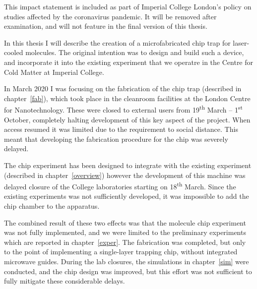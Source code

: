 This impact statement is included as part of Imperial College London's policy
on studies affected by the coronavirus pandemic. It will be removed after
examination, and will not feature in the final version of this thesis.

In this thesis I will describe the creation of a microfabricated chip trap for
laser-cooled \CaF{} molecules. The original intention was to design and build
such a device, and incorporate it into the existing \CaF{} experiment that we
operatre in the Centre for Cold Matter at Imperial College.

In March 2020 I was focusing on the fabrication of the
chip trap (described in chapter~\ref{fab}), which took place in the cleanroom
facilities at the London Centre for Nanotechnology. These were closed to
external users from 19\textsuperscript{th} March -- 1\textsuperscript{st}
October, completely halting development of this key aspect of the project. When
access resumed it was limited due to the requirement to social distance. This
meant that developing the fabrication procedure for the chip was severely
delayed.

The chip experiment has been designed to integrate with the existing \CaF
experiment (described in chapter~\ref{overview}) however the development of
this machine was delayed closure of the College laboratories starting on
18\textsuperscript{th} March. Since the existing experiments was not
sufficiently developed, it was impossible to add the chip chamber to the
apparatus. 

The combined result of these two effects was that the molecule chip experiment
was not fully implemented, and we were limited to the preliminary experiments
which are reported in chapter~\ref{exper}. The fabrication was completed, but
only to the point of implementing a single-layer trapping chip, without
integrated microwave guides. During the lab closures, the simulations in
chapter~\ref{sim} were conducted, and the chip design was improved, but this
effort was not sufficient to fully mitigate these considerable delays.
